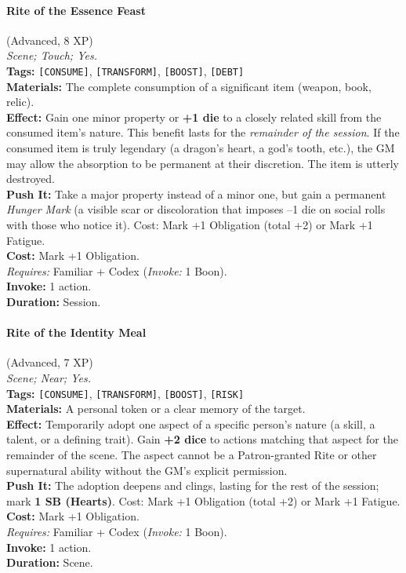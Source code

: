 \paragraph{Rite of the Essence Feast} (Advanced, 8 XP) \hfill \\
\emph{Scene; Touch; Yes.} \\
\textbf{Tags:} \texttt{[CONSUME]}, \texttt{[TRANSFORM]}, \texttt{[BOOST]}, \texttt{[DEBT]} \\
\textbf{Materials:} The complete consumption of a significant item (weapon, book, relic). \\
\textbf{Effect:} Gain one minor property or \textbf{+1 die} to a closely related skill from the consumed item's nature. This benefit lasts for the \textit{remainder of the session}. If the consumed item is truly legendary (a dragon's heart, a god's tooth, etc.), the GM may allow the absorption to be permanent at their discretion. The item is utterly destroyed. \\
\textbf{Push It:} Take a major property instead of a minor one, but gain a permanent \textit{Hunger Mark} (a visible scar or discoloration that imposes --1 die on social rolls with those who notice it). Cost: Mark +1 Obligation (total +2) or Mark +1 Fatigue. \\
\textbf{Cost:} Mark +1 Obligation. \\
\textit{Requires:} Familiar + Codex (\textit{Invoke:} 1 Boon). \\
\textbf{Invoke:} 1 action. \\
\textbf{Duration:} Session.

\paragraph{Rite of the Identity Meal} (Advanced, 7 XP) \hfill \\
\emph{Scene; Near; Yes.} \\
\textbf{Tags:} \texttt{[CONSUME]}, \texttt{[TRANSFORM]}, \texttt{[BOOST]}, \texttt{[RISK]} \\
\textbf{Materials:} A personal token or a clear memory of the target. \\
\textbf{Effect:} Temporarily adopt one aspect of a specific person's nature (a skill, a talent, or a defining trait). Gain \textbf{+2 dice} to actions matching that aspect for the remainder of the scene. The aspect cannot be a Patron-granted Rite or other supernatural ability without the GM's explicit permission. \\
\textbf{Push It:} The adoption deepens and clings, lasting for the rest of the session; mark \textbf{1 SB (Hearts)}. Cost: Mark +1 Obligation (total +2) or Mark +1 Fatigue. \\
\textbf{Cost:} Mark +1 Obligation. \\
\textit{Requires:} Familiar + Codex (\textit{Invoke:} 1 Boon). \\
\textbf{Invoke:} 1 action. \\
\textbf{Duration:} Scene.

